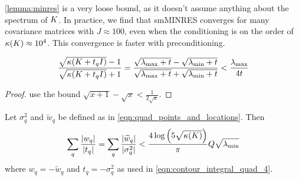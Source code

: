 \cref{lemma:minres} is a very loose bound, as it doesn't assume anything about the spectrum of $K$.
In practice, we find that smMINRES converges for many covariance matrices with $J \approx 100$, even when the conditioning is on the order of $\kappa(K) \approx 10^4$.
This convergence is faster with preconditioning.




\begin{lemma}
  \begin{align}
    \frac{
      \sqrt{\kappa(K + t_q I)} - 1
    }{
      \sqrt{\kappa(K + t_q I)} + 1
    } = \frac{\sqrt{\lambda_\text{max} + t} - \sqrt{\lambda_\text{min} + t}  }{\sqrt{\lambda_\text{max} + t} + \sqrt{\lambda_\text{min} + t}  }
    < \frac{\lambda_\text{max}}{4t}
  \end{align}
  \label{lemma:condition}
\end{lemma}
\begin{proof}
   use the bound $\sqrt{x+1} - \sqrt{x} < \frac{1}{2 \sqrt{x}}$.
\end{proof}




\begin{lemma}
  Let $\sigma_q^2$ and $\widetilde w_q$ be defined as in \cref{eqn:quad_points_and_locations}.
  Then
  \begin{equation*}
    \sum_q \frac{|w_q|}{|t_q|} = \sum_q \frac{|\widetilde w_q|}{|\sigma^2_q|} < \frac{4  \log \left( 5 \sqrt{\kappa(K)} \right)  }{\pi}Q\sqrt{\lambda_\text{min}} \\
  \end{equation*}
  where $w_q = -\widetilde w_q$ and $t_q = -\sigma^2_q$ as used in \cref{eqn:contour_integral_quad_4}.
  \label{lemma:quad_ratio}
\end{lemma}

